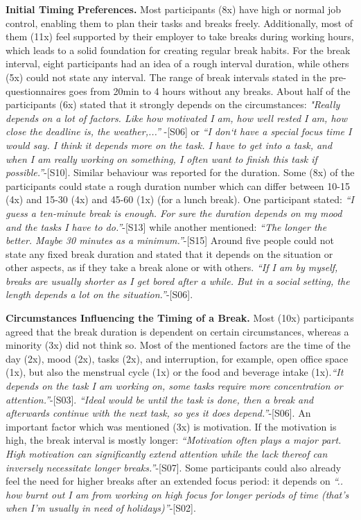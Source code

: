 \documentclass{hasel_thesis}
\begin{document}
\textbf{Initial Timing Preferences.}
Most participants (8x) have high or normal job control, enabling them to plan their tasks and breaks freely. Additionally, most of them (11x) feel supported by their employer to take breaks during working hours, which leads to a solid foundation for creating regular break habits. For the break interval, eight participants had an idea of a rough interval duration, while others (5x) could not state any interval. The range of break intervals stated in the pre-questionnaires goes from 20min to 4 hours without any breaks. About half of the participants (6x) stated that it strongly depends on the circumstances: \textit{"Really depends on a lot of factors. Like how motivated I am, how well rested I am, how close the deadline is, the weather,...” }-[S06] or \textit{“I don‘t have a special focus time I would say. I think it depends more on the task. I have to get into a task, and when I am really working on something, I often want to finish this task if possible.”}-[S10]. Similar behaviour was reported for the duration. Some (8x) of the participants could state a rough duration number which can differ between 10-15 (4x) and 15-30 (4x) and  45-60 (1x) (for a lunch break). One participant stated: \textit{“I guess a ten-minute break is enough. For sure the duration depends on my mood and the tasks I have to do.”}-[S13] while another mentioned: \textit{“The longer the better. Maybe 30 minutes as a minimum.”}-[S15] Around five people could not state any fixed break duration and stated that it depends on the situation or other aspects, as if they take a break alone or with others. \textit{“If I am by myself, breaks are usually shorter as I get bored after a while. But in a social setting, the length depends a lot on the situation.”}-[S06]. 

\textbf{Circumstances Influencing the Timing of a Break.}
Most (10x) participants agreed that the break duration is dependent on certain circumstances, whereas a minority (3x) did not think so. Most of the mentioned factors are the time of the day (2x), mood (2x), tasks (2x), and interruption, for example, open office space (1x), but also the menstrual cycle (1x) or the food and beverage intake (1x).\textit{“It depends on the task I am working on, some tasks require more concentration or attention.”}-[S03]. \textit{“Ideal would be until the task is done, then a break and afterwards continue with the next task, so yes it does depend.”}-[S06]. An important factor which was mentioned (3x) is motivation. If the motivation is high, the break interval is mostly longer: \textit{“Motivation often plays a major part. High motivation can significantly extend attention while the lack thereof can inversely necessitate longer breaks.”}-[S07]. Some participants could also already feel the need for higher breaks after an extended focus period: it depends on \textit{“.. how burnt out I am from working on high focus for longer periods of time (that's when I'm usually in need of holidays)”}-[S02].
\end{document}
